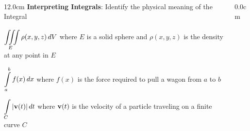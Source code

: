 \begin{frame}
{}
\scriptsize
\begin{columns}
\begin{column}{12.0cm}
{\bf Interpreting Integrals}: Identify the physical meaning of the Integral

\vspace{0.2cm}

\OBUL $\displaystyle{\iiint \limits_{E}^{} \rho(x,y,z)\, dV}$  \quad where \quad $E$ is a solid sphere and $\rho(x,y,z)$ is the density at any point in $E$

\vspace{0.2cm}

\begin{center}
\end{center}

\vspace{0.6cm}

\OBUL $\displaystyle{\int \limits_{a}^{b} f(x)\, dx}$  \quad where \quad $f(x)$ is the force required to pull a wagon from $a$ to $b$

\vspace{0.2cm}

\begin{center}
\end{center}

\vspace{0.6cm}

\OBUL $\displaystyle{\int \limits_{C} |{\bf v}(t)|\, dt}$  \quad where \quad ${\bf v}(t)$ is the velocity of a particle traveling on a finite curve $C$

\vspace{0.2cm}

\begin{center}
\end{center}

\vspace{0.6cm}

\end{column}
\begin{column}{0.0cm}\end{column}
\end{columns}
\end{frame}

